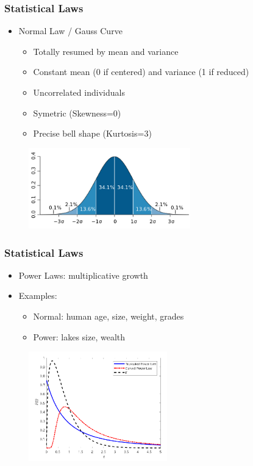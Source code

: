 \begin{frame}\frametitle{Statistical Laws}
   \begin{itemize}
      \item Normal Law / Gauss Curve
      \begin{itemize}
         \item Totally resumed by mean and variance
         \item Constant mean (0 if centered) and variance (1 if reduced)
         \item Uncorrelated individuals
         \item Symetric (Skewness=0)
         \item Precise bell shape (Kurtosis=3)
      \end{itemize}
   \end{itemize}
   \vspace{.5cm}
   \begin{figure}[H]
      \includegraphics[width=7cm]{../images/illustrations/stat_normal_law.png}
   \end{figure}
\end{frame}



\begin{frame}\frametitle{Statistical Laws}
   \begin{itemize}
      \item Power Laws: multiplicative growth
      \item Examples:
      \begin{itemize}
         \item Normal: human age, size, weight, grades
         \item Power: lakes size, wealth
      \end{itemize}
   \end{itemize}
   \vspace{.5cm}
   \begin{figure}[H]
      \includegraphics[width=6cm]{../images/illustrations/stat_power_law.png}
   \end{figure}
\end{frame}


